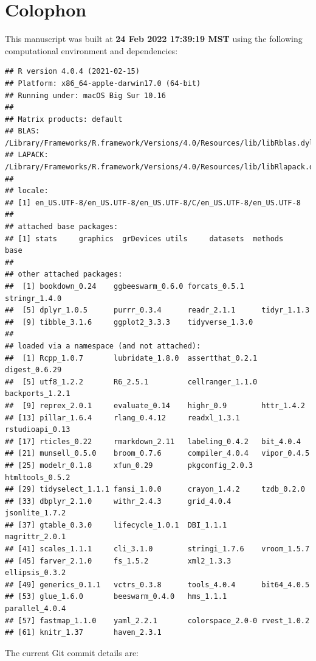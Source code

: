 \documentclass[smallextended]{svjour3}       %
\begin{document}
\hypertarget{colophon}{%
\section{Colophon}\label{colophon}}

This manuscript was built at \textbf{24 Feb 2022 17:39:19 MST} using the following computational environment and dependencies:

\begin{verbatim}
## R version 4.0.4 (2021-02-15)
## Platform: x86_64-apple-darwin17.0 (64-bit)
## Running under: macOS Big Sur 10.16
## 
## Matrix products: default
## BLAS:   /Library/Frameworks/R.framework/Versions/4.0/Resources/lib/libRblas.dylib
## LAPACK: /Library/Frameworks/R.framework/Versions/4.0/Resources/lib/libRlapack.dylib
## 
## locale:
## [1] en_US.UTF-8/en_US.UTF-8/en_US.UTF-8/C/en_US.UTF-8/en_US.UTF-8
## 
## attached base packages:
## [1] stats     graphics  grDevices utils     datasets  methods   base     
## 
## other attached packages:
##  [1] bookdown_0.24    ggbeeswarm_0.6.0 forcats_0.5.1    stringr_1.4.0   
##  [5] dplyr_1.0.5      purrr_0.3.4      readr_2.1.1      tidyr_1.1.3     
##  [9] tibble_3.1.6     ggplot2_3.3.3    tidyverse_1.3.0 
## 
## loaded via a namespace (and not attached):
##  [1] Rcpp_1.0.7       lubridate_1.8.0  assertthat_0.2.1 digest_0.6.29   
##  [5] utf8_1.2.2       R6_2.5.1         cellranger_1.1.0 backports_1.2.1 
##  [9] reprex_2.0.1     evaluate_0.14    highr_0.9        httr_1.4.2      
## [13] pillar_1.6.4     rlang_0.4.12     readxl_1.3.1     rstudioapi_0.13 
## [17] rticles_0.22     rmarkdown_2.11   labeling_0.4.2   bit_4.0.4       
## [21] munsell_0.5.0    broom_0.7.6      compiler_4.0.4   vipor_0.4.5     
## [25] modelr_0.1.8     xfun_0.29        pkgconfig_2.0.3  htmltools_0.5.2 
## [29] tidyselect_1.1.1 fansi_1.0.0      crayon_1.4.2     tzdb_0.2.0      
## [33] dbplyr_2.1.0     withr_2.4.3      grid_4.0.4       jsonlite_1.7.2  
## [37] gtable_0.3.0     lifecycle_1.0.1  DBI_1.1.1        magrittr_2.0.1  
## [41] scales_1.1.1     cli_3.1.0        stringi_1.7.6    vroom_1.5.7     
## [45] farver_2.1.0     fs_1.5.2         xml2_1.3.3       ellipsis_0.3.2  
## [49] generics_0.1.1   vctrs_0.3.8      tools_4.0.4      bit64_4.0.5     
## [53] glue_1.6.0       beeswarm_0.4.0   hms_1.1.1        parallel_4.0.4  
## [57] fastmap_1.1.0    yaml_2.2.1       colorspace_2.0-0 rvest_1.0.2     
## [61] knitr_1.37       haven_2.3.1
\end{verbatim}

The current Git commit details are:
\end{document}
